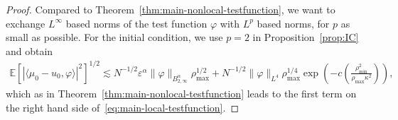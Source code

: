 \documentclass[a4paper,12pt]{article}
\begin{document}
\begin{proof}
Compared to Theorem~\ref{thm:main-nonlocal-testfunction}, we want to exchange $L^\infty$ based norms of the test function $\varphi$ with $L^p$ based norms, for $p$ as small as possible. For the initial condition, we use $p=2$ in Proposition~\ref{prop:IC} and obtain
\begin{align*} 
        \mathbb{E}\left[\left|\langle \mu_0-u_0,\varphi\rangle\right|^2\right]^{1/2}
        \lesssim N^{-1/2}\varepsilon^\alpha\|\varphi\|_{B_{2,\infty}^\alpha} \rho_{\max}^{1/2} + N^{-1/2}\|\varphi\|_{L^4}\rho_{\max}^{1/4}\exp\left(-c \left(\frac{\rho_{\min}^2}{\rho_{\max}\kappa^2}\right)\right),
\end{align*}
which as in Theorem~\ref{thm:main-nonlocal-testfunction} leads to the first term on the right hand side of~\eqref{eq:main-local-testfunction}.


\end{proof}
\end{document}
